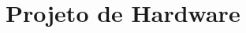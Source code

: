 \documentclass[aspectratio=169]{beamer}
\makeatletter
\newcounter{prismfigure}
\renewcommand{\theprismfigure}{\arabic{prismfigure}}
\let\prism@original@includegraphics\includegraphics
\renewcommand{\includegraphics}[2][]{%
    \prism@original@includegraphics[#1]{#2}%
    \refstepcounter{prismfigure}%
    \label{fig:auto-\theprismfigure}%
}
\makeatother
\begin{document}


        
        



\section{Projeto de Hardware}
\end{document}
